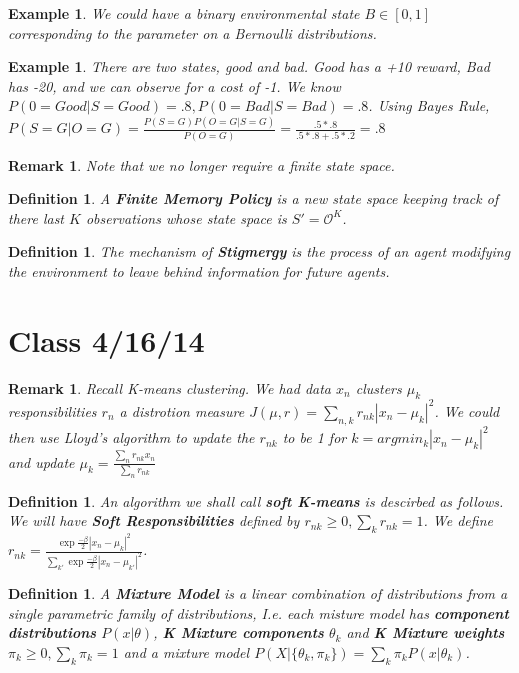 \documentclass{amsart}
\newtheorem{defn}[subsubsection]{Definition}
\newtheorem{rem}[subsubsection]{Remark}
\newtheorem{eg}[subsection]{Example}
\begin{document}
\begin{eg}
We could have a binary environmental state $B \in [0,1]$ corresponding to the parameter on a Bernoulli distributions.
\end{eg}

\begin{eg}
  There are two states, good and bad. Good has a +10 reward, Bad has -20, and we can observe for a cost of -1. We know $P(0=Good|S=Good) = .8,P(0=Bad|S=Bad) = .8$. Using Bayes Rule, $P(S=G|O=G) = \frac{P(S=G)P(O=G|S=G)}{P(O=G)} = \frac{.5*.8}{.5*.8+.5*.2} = .8$
\end{eg}

\begin{rem}
Note that we no longer require a finite state space.
\end{rem}

\begin{defn}
A {\bf Finite Memory Policy} is a new state space keeping track of there last $K$ observations whose state space is $S' = {\mathcal O}^K$.
\end{defn}

\begin{defn}
The mechanism of {\bf Stigmergy} is the process of an agent modifying the environment to leave behind information for future agents.
\end{defn}

\section{Class 4/16/14}

\begin{rem}
Recall K-means clustering. We had data $x_n$ clusters $\mu_k$ responsibilities $r_n$ a distrotion measure $J(\mu,r) = \sum_{n,k} r_{nk}|x_n - \mu_k|^2$. We could then use Lloyd's algorithm to update the $r_{nk}$ to be 1 for $k=argmin_k|x_n-\mu_k|^2$ and update $\mu_k = \frac{\sum_n r_{nk} x_n}{\sum_n r_{nk}}$
\end{rem}

\begin{defn}
An algorithm we shall call {\bf soft K-means} is descirbed as follows. We will have {\bf Soft Responsibilities} defined by $r_{nk} \geq 0, \sum_k r_{nk}=1$. We define $r_{nk} = \frac{\exp{\frac{-\beta}{2}|x_n-\mu_k|^2}}{\sum_{k'}\exp {\frac{-\beta}{2}|x_n-\mu_{k'}|^2}}$.
\end{defn}

\begin{defn}
A {\bf Mixture Model} is a linear combination of distributions from a single parametric family of distributions, I.e. each misture model has {\bf component distributions} $P(x|\theta)$, {\bf K Mixture components} $\theta_k$ and {\bf K Mixture weights} $\pi_k \geq 0,\sum_k \pi_k = 1$ and a mixture model $P(X|\{\theta_k,\pi_k\}) = \sum_k \pi_k P(x|\theta_k)$.
\end{defn}
\end{document}
